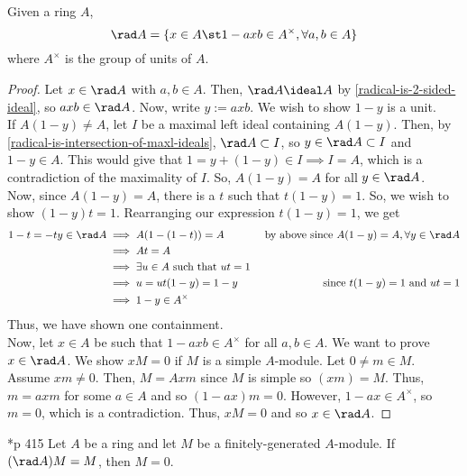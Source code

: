 \documentclass[11pt,leqno,oneside]{amsbook}
\numberwithin{thm}{section}
\begin{document}
\begin{thm}\label{one-minus-radical-is-unit}
  Given a ring \(A\), \[
    \rad A = \{x \in A \st 1-axb \in A^\times, \forall a,b \in A\}
  \]
  where \(A^\times\) is the group of units of \(A\).
\end{thm}
\begin{proof}
  Let \(x \in \rad A\) with \(a,b \in A\). Then, \(\rad A \ideal A\)
  by \ref{radical-is-2-sided-ideal}, so \(axb \in \rad A\). Now, write
  \(y := axb\). We wish to show \(1-y\) is a unit. \\

  If \(A(1-y) \neq A\), let \(I\) be a maximal left ideal containing
  \(A(1-y)\). Then, by \ref{radical-is-intersection-of-maxl-ideals},
  \(\rad A \subset I\), so \(y \in \rad A \subset I\) and \(1-y \in
  A\). This would give that \(1 = y + (1-y) \in I \implies I = A\),
  which is a contradiction of the maximality of \(I\). So, \(A(1-y) =
  A\) for all \(y \in \rad A\). \\

  Now, since \(A(1-y) = A\), there is a \(t\) such that \(t(1-y) =
  1\). So, we wish to show \((1-y)t = 1\). Rearranging our expression
  \(t(1-y) = 1\), we get
  \begin{align*}
    1-t = -ty \in \rad A
    & \implies A(1-(1-t)) = A
    & \text{ by above since }A(1-y) = A, \forall y \in \rad A \\
    & \implies At = A \\
    & \implies \exists u \in A \text{ such that } ut=1 \\
    & \implies u = ut(1-y) = 1-y
    & \text{since }t(1-y)=1 \text{ and }ut=1 \\
    & \implies 1-y \in A^\times
  \end{align*}
  Thus, we have shown one containment. \\

  Now, let \(x \in A\) be such that \(1-axb \in A^\times\) for all
  \(a,b \in A\). We want to prove \(x \in \rad A\). We show \(xM = 0\)
  if \(M\) is a simple \(A\)-module. Let \(0 \neq m \in M\). Assume
  \(xm \neq 0\). Then, \(M = Axm\) since \(M\) is simple so \((xm) =
  M\). Thus, \(m = axm\) for some \(a \in A\) and so \((1-ax)m =
  0\). However, \(1-ax \in A^\times\), so \(m = 0\), which is a
  contradiction. Thus, \(xM = 0\) and so \(x \in \rad A\).
\end{proof}
\begin{thm}
  \cite{jacobson}*{p 415} Let \(A\) be a ring and let \(M\) be a finitely-generated
  \(A\)-module. If \((\rad A)M = M\), then \(M = 0\).
\end{thm}
\end{document}
